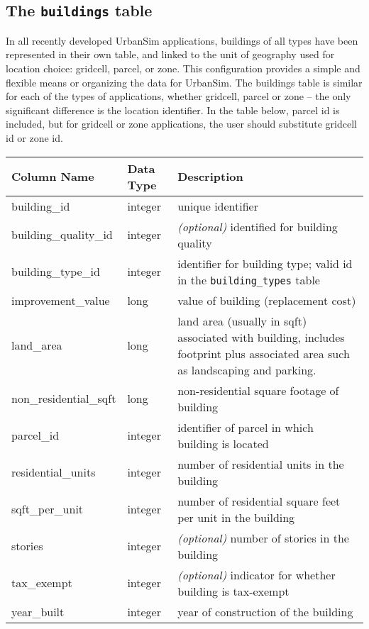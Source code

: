 \subsection{The {\tt buildings} table}

In all recently developed UrbanSim applications, buildings of all types have been represented in their own
table, and linked to the unit of geography used for location choice: gridcell, parcel, or zone.  This configuration
provides a simple and flexible means or organizing the data for UrbanSim.  The buildings table is similar
for each of the types of applications, whether gridcell, parcel or zone -- the only significant difference is the
location identifier.  In the table below, parcel id is included, but for gridcell or zone applications, the user
should substitute gridcell id or zone id.

\begin{tabular}{p{2in}lp{3.5in}}
\textbf{Column Name} & \textbf{Data Type} & \textbf{Description} \\
\hline
building\_id & integer & unique identifier \\ \hline
building\_quality\_id & integer & \emph{(optional)} identified for building quality\\ \hline
building\_type\_id & integer & identifier for building type; valid id in the \verb|building_types| table\\ \hline
improvement\_value & long & value of building (replacement cost)\\ \hline
land\_area & long & land area (usually in sqft) associated with building, includes footprint plus associated area such as landscaping and parking.\\ \hline
non\_residential\_sqft & long & non-residential square footage of building\\ \hline 
parcel\_id & integer & identifier of parcel in which building is located\\ \hline
residential\_units & integer & number of residential units in the building\\ \hline
sqft\_per\_unit & integer & number of residential square feet per unit in the building\\ \hline
stories & integer & \emph{(optional)} number of stories in the building\\ \hline
tax\_exempt & integer & \emph{(optional)} indicator for whether building is tax-exempt\\ \hline
year\_built & integer & year of construction of the building\\ \hline
\end{tabular}


